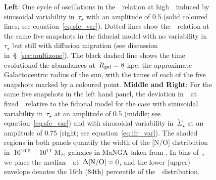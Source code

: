 \documentclass[ms.tex]{subfiles}
\begin{document}
\begin{figure}
\caption{
\textbf{Left}: One cycle of oscillations in the~\ohno~relation at
high~\oh~induced by sinusoidal variability in~$\tau_\star$ with an amplitude of
0.5 (solid coloured lines; see equation~\ref{eq:sfe_var}).
Dotted lines show the~\ohno~relation at the same five snapshots in the fiducial
model with no variability in~$\tau_\star$ but still with diffusion migration
(see discussion in~\S~\ref{sec:multizone}).
The black dashed line shows the time evolutionof the abundances at~$R_\text{gal} = 8$
kpc, the approximate Galactocentric radius of the sun, with the times of each
of the five snapshots marked by a coloured point.
\textbf{Middle and Right}: For the same five snapshots in the left hand panel,
the deviation in~\no~at fixed~\oh~relative to the fiducial model for the case
with sinusoidal variability in~$\tau_\star$ at an amplitude of 0.5 (middle; see
equation~\ref{eq:sfe_var})
and with sinusoidal variability in~$\dot{\Sigma}_\star$ at an amplitude of 0.75
(right; see equation~\ref{eq:ifr_var}).
The shaded regions in both panels quantify the width of the [N/O] distribution
in~$10^{10.5} - 10^{11}~\text{M}_\odot$ galaxies in MaNGA taken from
\citet{Schaefer2020}.
In bins of~\oh, we place the median~\no~at~$\Delta\text{[N/O]} = 0$, and the lower
(upper) envelope denotes the 16th (84th) percentile of the~\no~distribution.
}
\label{fig:schaefer_comp}
\end{figure}
\end{document}
